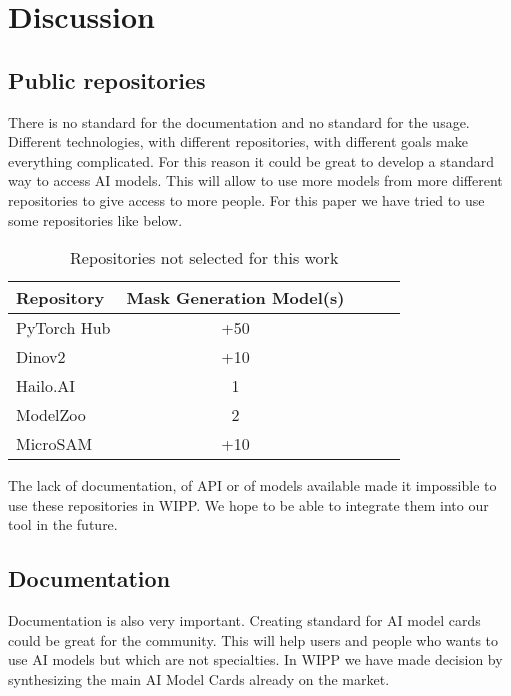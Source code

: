 \section{Discussion}
\label{sec:discussion}

\subsection{Public repositories}

There is no standard for the documentation and no standard for the usage.
Different technologies, with different repositories, with different goals make
everything complicated. For this reason it could be great to develop a standard
way to access AI models. This will allow to use more models from more different
repositories to give access to more people. For this paper we have tried to use
some repositories like below.

\begin{table}[H]
    \centering
    \caption{\label{tab:discussion}%
        Repositories not selected for this work
    }
    \begin{tabular}{lcccc}
      \toprule
      Repository & Mask Generation Model(s) \\
      \midrule
      PyTorch Hub & +50 \\
      Dinov2 & +10 \\
      Hailo.AI & 1 \\
      ModelZoo & 2 \\
      MicroSAM & +10 \\
      \bottomrule
    \end{tabular}
\end{table}

The lack of documentation, of API or of models available made it impossible to
use these repositories in WIPP. We hope to be able to integrate them into our
tool in the future.

\subsection{Documentation}

Documentation is also very important. Creating standard for AI model cards could
be great for the community. This will help users and people who wants to use AI
models but which are not specialties. In WIPP we have made decision by
synthesizing the main AI Model Cards already on the market.

\def\firstellip{(1.6, 0) ellipse [x radius=2.7cm, y radius=1.5cm, rotate=50]}
\def\secondellip{(0.3, 1cm) ellipse [x radius=2.7cm, y radius=1.5cm, rotate=50]}
\def\thirdellip{(-1.6, 0) ellipse [x radius=2.7cm, y radius=1.5cm, rotate=-50]}
\def\fourthellip{(-0.3, 1cm) ellipse [x radius=2.7cm, y radius=1.5cm, rotate=-50]}

